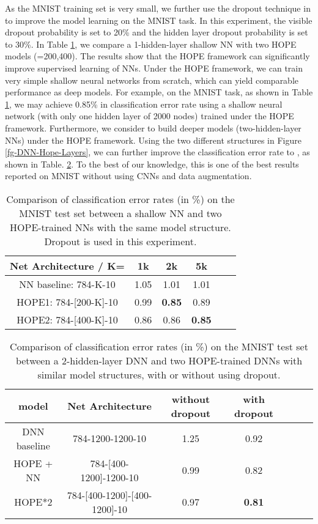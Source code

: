 \documentclass[11pt]{article}
\begin{document}
As the MNIST training set is very small, we further use the dropout technique 
in \cite{Hinton2012Dropout} to improve the model learning on the MNIST task. 
In this experiment, the visible dropout probability is set to 20\% and the hidden layer dropout probability is set to 30\%. 
In Table \ref{MNIST_SL_2}, we compare a 1-hidden-layer shallow NN with two HOPE models (=200,400). The results show that the HOPE framework can significantly improve supervised learning of NNs. Under the HOPE framework, we can train very simple shallow neural networks from scratch, which can yield comparable performance as deep models. For example, on the MNIST task, as shown in Table \ref{MNIST_SL_2}, we may achieve 0.85\% in classification error rate using a shallow neural network (with only one hidden layer of 2000 nodes) trained under the HOPE framework.
Furthermore, we consider to build deeper models (two-hidden-layer NNs) under the HOPE framework. Using the two different structures in Figure \ref{fg-DNN-Hope-Layers}, we can further improve the classification error rate to , as shown in Table. \ref{MNIST_SL_3}. To the best of our knowledge, this is one of the best results reported on MNIST without using CNNs and data augmentation. 

\begin{table}{}
	\centering
	\caption{Comparison of classification error rates (in \%) on the MNIST test set between a shallow NN and two HOPE-trained NNs with the same model structure.  Dropout is used in this experiment.}
	\begin{tabular}{|c|c|c|c|c|c|} \hline
		 Net Architecture / K= &  1k& 2k &5k \\ \hline 
		 NN baseline: 784-K-10& 1.05 & 1.01 & 1.01 \\ \hline \hline
		 HOPE1: 784-[200-K]-10 & 0.99 & {\bf 0.85} & 0.89 \\\hline 
		 HOPE2: 784-[400-K]-10 & 0.86 & 0.86 & {\bf 0.85} \\\hline
	\end{tabular} 
	\label{MNIST_SL_2}
\end{table}

\begin{table}
	\centering
	\caption{Comparison of classification error rates (in \%) on the MNIST test set between a 2-hidden-layer DNN and two HOPE-trained DNNs with similar model structures, with or without using dropout. }
	\begin{tabular}{|c|c|c|c|c|c|c|} \hline
      model & Net Architecture &  without dropout & with dropout \\\hline
	  DNN baseline &  784-1200-1200-10 & 1.25 & 0.92 \\\hline \hline
	  HOPE + NN & 784-[400-1200]-1200-10 & 0.99 & 0.82\\\hline 
	  HOPE*2 & 784-[400-1200]-[400-1200]-10 & 0.97 & {\bf 0.81} \\\hline 	
	\end{tabular} 
	\label{MNIST_SL_3}
\end{table}
\end{document}
